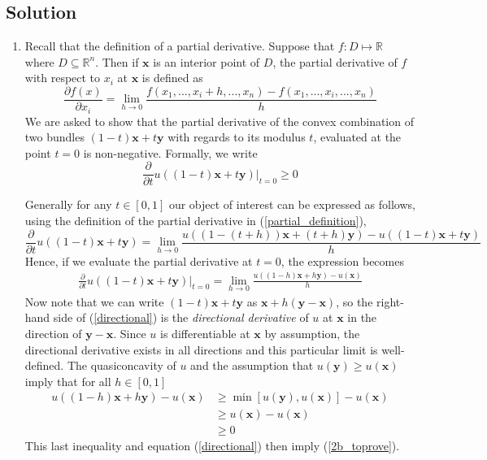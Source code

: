 \documentclass[a4paper,11pt,american]{article}
\newcommand{\reals}{\mathbb{R}}
\newcommand{\xx}{\mathbf{x}}
\begin{document}
\subsection{Solution}
\begin{enumerate}[label = \alph*)]
    \item 
        Recall that the definition of a partial derivative. Suppose that $f : D \mapsto \reals$ where $D \subseteq \reals^n$. Then if $\xx$ is an interior point of $D$, the partial derivative of $f$ with respect to $x_i$ at $\xx$ is defined as 
    \begin{equation}
    \frac{\partial f(x)}{\partial x_i} = \lim_{h \to 0}\frac{f(x_1, ..., x_i + h, ..., x_n) - f(x_1, ..., x_i, ..., x_n)}{h} \label{partial_definition}
    \end{equation}
    We are asked to show that the partial derivative of the convex combination of two bundles $(1 - t) \xx + t \mathbf{y}$ with regards to its modulus $t$, evaluated at the point $t = 0$ is non-negative. Formally, we write
    \begin{equation}
    \frac{\partial}{\partial t} u((1 - t) \xx + t \mathbf{y}) \Bigr\rvert_{t = 0} \geq 0 \label{2b_toprove}
    \end{equation}
    
    Generally for any $t \in [0,1]$ our object of interest can be expressed as follows, using the definition of the partial derivative in (\ref{partial_definition}),
    \begin{equation}
    \frac{\partial}{\partial t} u((1 - t) \xx + t \mathbf{y}) = \lim_{h \to 0} \frac{ u((1 - (t + h)) \xx + (t + h) \mathbf{y}) - u((1 - t) \xx + t \mathbf{y})}{h}
    \end{equation}
    Hence, if we evaluate the partial derivative at $t = 0$, the expression becomes
    \begin{align}
    \frac{\partial}{\partial t} u((1 - t) \xx + t \mathbf{y})  \Bigr\rvert_{t = 0} = \lim_{h \to 0} \frac{ u((1 - h) \xx + h\mathbf{y}) - u( \xx )}{h} \label{directional}
    \end{align}
    Now note that we can write $(1 - t) \xx + t \mathbf{y}$ as $\xx + h (\mathbf{y} - \xx)$, so the right-hand side of (\ref{directional}) is the \textit{directional derivative} of $u$ at $\xx$ in the direction of $\mathbf{y} - \xx$. Since $u$ is differentiable at $\xx$ by assumption, the directional derivative exists in all directions and this particular limit is well-defined.
    The quasiconcavity of $u$ and the assumption that $u(\mathbf{y}) \geq u(\xx)$ imply that for all $h \in [0,1]$ 
    \begin{align*}
        u((1 - h) \xx + h \mathbf{y}) - u( \xx ) &\geq \min[u(\mathbf{y}),u( \xx )] - u( \xx ) \\
        &\geq u( \xx ) - u( \xx ) \\
        &\geq 0
    \end{align*}
    This last inequality and equation (\ref{directional}) then imply (\ref{2b_toprove}).
    

\end{enumerate}
\end{document}
